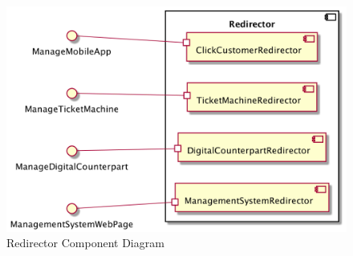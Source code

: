 \documentclass[a4paper,12pt]{report}
\begin{document}
\begin{figure}
	\centering
	\includegraphics[scale=0.2]{component_diagram_redirector}
	\caption{Redirector Component Diagram}
	\centering
	\label{fig:component_diagram_redirector}
\end{figure}
\end{document}
